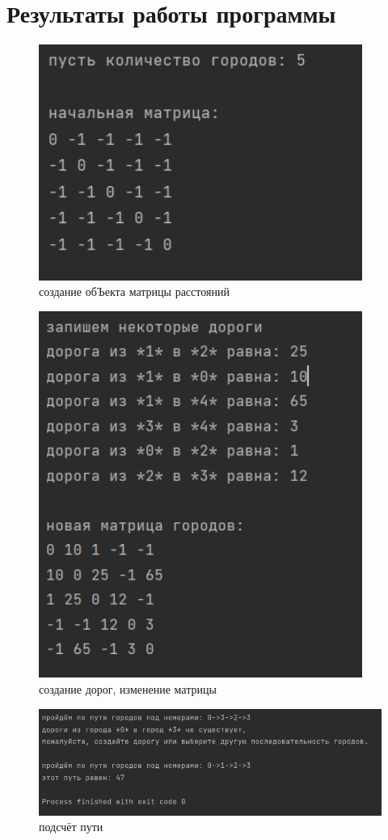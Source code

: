 ﻿\documentclass[a4paper, 12pt]{extarticle}
\begin{document}
\section{Результаты работы программы}
\begin{figure}[H]
    \centering
    \includegraphics[width=300pt]{Test.png}
    \caption{создание обЪекта матрицы расстояний}
    \label{fig:my_label}
\end{figure}

\begin{figure}[H]
    \centering
    \includegraphics[width=300pt]{Test1.png}
    \caption{создание дорог, изменение матрицы}
    \label{fig:my_label}
\end{figure}

\begin{figure}[H]
    \centering
    \includegraphics[width=\linewidth]{Test2.png}
    \caption{подсчёт пути}
    \label{fig:my_label}
\end{figure}
\end{document}
